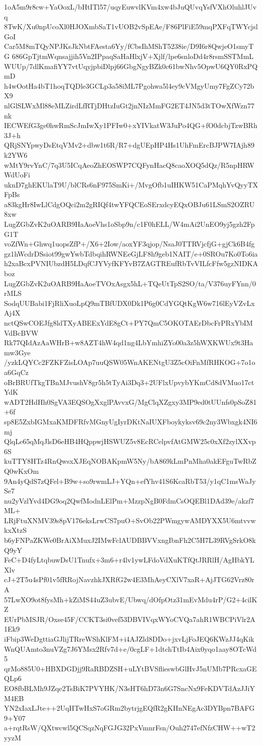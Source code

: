 1oA5m9r8cw+YaOoxL/bHtITl57/uqyEuwvlKVm4xw4bJuQUvqYsfVXhOluhlJUvq
8TwK/Xu0npUcoXl0HJOXmbSaT1vUOB2vSpEAe/F86PlFiE59mqPXFqTWYcjslGoI
Car5M8mTQyNPJKsJkNbtFAesta6Yy/fCbsIhMShT5238ie/D9I6r8QwjeO1smyTG
686GpTjtmWqnsajjih5Vn2IPpaqSaHaHlxjV+Xjlf/lpe6snloDd4r8rsmSSTMmL
WUUp/7dlKmafiYY7vtUqyjpbiDlpj66GbgNgyBZk0c61bwNhv5OpwU6QY0RxPQmD
h4wOotHa4bT1hoqTQDle3GCLp3a58iML7Pgohwa5l4ey9cVMgyUmy7FgZCy72bX9
nlGlSLWxMl88eMLZirdLfRTjDHtzIuGt2jnNIzMmFG2ET4JN5d3tTOwXfWzn77nk
IECWEfG3ge0hwRmScJmIwXy1PFIw0+xYIVkatW3JuPo4QG+fO0dcbjTzwBRh3J+h
QRjSNYpwyDsEtqVMv2+dbw1t6R/R7+dgUEpHP4Hs1UhFmErcBJPW7IAjh89k2YW6
wMtY9rvYnC/7q3U5ICqAeoZhEOSWP7CQFynHacQ8caoXOQ5dQz/R5npHRWWdUoFi
uknD7ghEKUlaT9U/blCRs6nF975SmKi+/MvgOfb1uIHKW51CaPMqhYvQyyTXFpBs
a83kgHr8IwLlCdgOQci2m2gRIQf4twYFQCEoSErxdcyEQxOBJu61LSmS2OZRU8xw
LugZGbZvK2uOARB9HaAoeVhs1oSbp9n/c1F0hELL/W4mAi2UnEO9yj5gzh2FpG1T
voZfWn+Ghwq1uopsZfP+/X6+2Iow/aoxYF3qjop/NsaJ0TTRVjcfjG+gjCk6B4fg
gz1hWcdrDSsiot99gwYwbTdbqihRWNEeGjLF8h9geb1NAIT/e+0SROu7Ko0To6ia
h2xaBcxPVNIUbzdH5LDqfCJYVyfKFYvB7ZAGTREufRbTvVILfcFfw5gzNIDKAboz
LugZGbZvK2uOARB9HaAoeTVOxAsgx5hL+TQeUtTpS2SO/ta/V376uyFYnn/0rMLS
SodqUUBabi1FjRliXuoLpQ9mTBfUDX0Dk1P6g0CdYGQtKgW6w716lEyVZvLxAj4X
nctQSwCOEJfg8ldTXyABEExYdE8gCt+PY7QmC5OKOTAErDbcFrPRxYbIMVdBcBVW
Rk77QIdAzAaWHrB+w8AZT4hW4qd1ng4LbYmhiZYo00a3z5hWXKWUx9t3Hamw3Gye
/yzkLQYCc2FZKFZisLOAp7uuQSW05WnAKENtgU3Z5cOiFnMfRHKOG+7o1oa6GqCz
oBrBRUfTkgTBnMJvushV8gr5h5tTyAi3Dq3+2UFlxUpvybYKmCd8dVMuo17ctYdK
wADT2HdHh0SgVA3EQSOgXxglPAvvxG/MgClqXZgxy3MP9ed0tUUnfs0pSoZ81+6f
sp8E5ZxbIGMxaKMDFRfvMGnyUgIyrDKtNaIUXFboykyksv69c2ny3Wbxgk4NI6mj
QlqLe65qMqJlsD6eHB4HQppwjHSWUZ5v8EcRCelpvfAtGMW25c0xXf2zylXXvp6S
kuTTY8HTz4RnQwsxXJEqNOBAKpmW5Ny/bA869kLmPnMha0akEFguTwRbZQ0wKxOm
9An4yQdS7zQFel+B9w+so9rwmLJ+YQn+efYhv41S6KcaRbT53/y1qC1msWaJySe7
nu2yVzlYvd4DG9oq2QwfModnLElPm+MzzpNgB0FdmCsOQEBl1DAd39e/akzf7ML+
LRjFtuXNMV39s8pV176eksLrwCS7puO+SvOb22PWmgywAMDYXX5U6mtvvwkxXtzS
b6yFNPaZKWe0BrAiXMuxJ2IMwFclAUDBBVVxngIbnFh2C5H7L39RVgSrkO8kQ9yY
FeC+D4fyLtqbuwDsU1Tnufx+3m6+r4lv1ywLFdoVdXuKTfQtJRRlH/AgHbkYLXlv
cJ+2T5u4sPf01v5fRRojNavzhkJXRfG2w4E3MhAeyCXlV7xaR+AjJTG62Vrz80rA
57LwXO9ot8fysMh+kZiMS44uZ3ubvE/Ubwq/dOfpOtz31mEvMdu4rP/G2+4cilKZ
EUrPbMSJR/Oxse45F/CCKT3si0vef53DBVIVqxWYoCVQa7ahR1WBCPiVlr2A1Ek9
iFbip3WeDgttiaGJlijTRreWShKlFM+i4AJZld8DDo+jxvLjFoJEQ6KWzJJ4qKik
WnQUAmto3nuVZg7J6YMsx2Rfv7d+e/0cgLF+1dtchTtIb4Aix0yqo1aay8OTcWd5
qrMo885U0+HBXDGDjj9RaRBDZSH+uLYtBVSflieswbGlHvJ5nUMb7PRcxaGEQLp6
EO8fbBLMh9JZqe2TsBiK7PVYHK/N3sHT6hD73n6G7SncNx9FeKDVTdAzJJiYM4EB
YN2xIaxLJte++2UqHTwHxS7oGRm2bytrjgEQfR2gKHnNEgAc3DYBpn7BAFG9+Y07
a+rqtRsW/QXtwcwl5QCSqzNqFGJG32PxVmnrFsn/Ouh2747efNfzCHW++wT2yyzM
